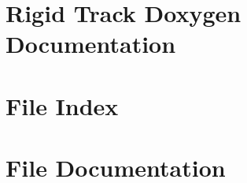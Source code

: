 \documentclass[a4paper,11pt,twoside,openright,bibtotoc,liststotoc,tablecaptionabove]{fsd}
\newcommand{\+}{\discretionary{\mbox{\scriptsize$\hookleftarrow$}}{}{}}
\newcommand{\clearemptydoublepage}{%
	\newpage{\pagestyle{empty}\cleardoublepage}%
}
\begin{document}




\setcounter{page}{1}
\tableofcontents

\pagestyle{plain}

\mbox{}



\chapter{Rigid Track Doxygen Documentation}
\label{index}\hypertarget{index}{}
\chapter{File Index}

\chapter{File Documentation}





\backmatter
\newpage
{}
\clearemptydoublepage
{}
\printindex
\end{document}
